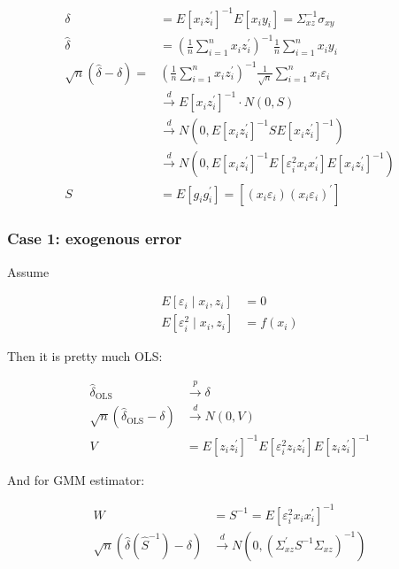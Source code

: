 \begin{align*}
    \delta&=E\left[x_i z_i^{\prime}\right]^{-1} E\left[x_i y_i\right]=\Sigma_{x z}^{-1} \sigma_{x y} \\
    \widehat{\delta}&=\left(\frac{1}{n} \sum_{i=1}^n x_i z_i^{\prime}\right)^{-1} \frac{1}{n} \sum_{i=1}^n x_i y_i\\
    \sqrt{n}(\widehat{\delta}-\delta)=&\left(\frac{1}{n} \sum_{i=1}^n x_i z_i^{\prime}\right)^{-1} \frac{1}{\sqrt{n}} \sum_{i=1}^n x_i \varepsilon_i \\
    & \stackrel{d}{\longrightarrow} E\left[x_i z_i^{\prime}\right]^{-1} \cdot N(0, S) \\
    & \stackrel{d}{\longrightarrow} N(0, E\left[x_i z_i^{\prime}\right]^{-1} S E\left[x_i z_i^{\prime}\right]^{-1}) \\
    & \stackrel{d}{\longrightarrow} N(0, E\left[x_i z_i^{\prime}\right]^{-1} E\left[\varepsilon_i^2 x_i x_i^\prime \right] E\left[x_i z_i^{\prime}\right]^{-1}) \\
    S&=E\left[g_i g_i^{\prime}\right] = \left[(x_i \varepsilon_i)(x_i \varepsilon_i)^{\prime}\right] 
\end{align*}

\subsubsection{Case 1: exogenous error}

Assume 

\begin{align*}
    E\left[\varepsilon_i \mid x_i, z_i\right]&=0 \\
    E\left[\varepsilon_i^2 \mid x_i, z_i\right]&=f(x_i)
\end{align*}

Then it is pretty much OLS:

\begin{align*}
    \widehat{\delta}_{\operatorname{OLS}} &\stackrel{p}{\longrightarrow} \delta \\
    \sqrt{n}(\widehat{\delta}_{\operatorname{OLS}}-\delta) &\stackrel{d}{\longrightarrow} N(0, V) \\
    V &= E\left[z_i z_i^{\prime}\right]^{-1}  E\left[\varepsilon_i^2 z_i z_i^\prime \right] E\left[z_i z_i^{\prime}\right]^{-1}
\end{align*}

And for GMM estimator:

\begin{align*}
    W&=S^{-1}=E\left[\varepsilon_i^2 x_i x_i^{\prime}\right]^{-1} \\
    \sqrt{n}\left(\widehat{\delta}\left(\widehat{S}^{-1}\right)-\delta\right) &\stackrel{d}{\longrightarrow} N\left(0,\left(\Sigma_{x z}^{\prime} S^{-1} \Sigma_{x z}\right)^{-1}\right)
\end{align*}

